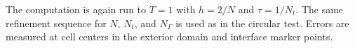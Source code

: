 \documentclass[11pt,reqno]{amsart}
\theoremstyle{plain}
\theoremstyle{definition}
\numberwithin{equation}{section}
\begin{document}
The computation is again run to $T=1$ with $h=2/N$ and $\tau=1/N_t$. The same
refinement sequence for $N$, $N_t$, and $N_\Gamma$ is used as in the circular
test. Errors are measured at cell centers in the exterior domain and interface marker points.



\end{document}
